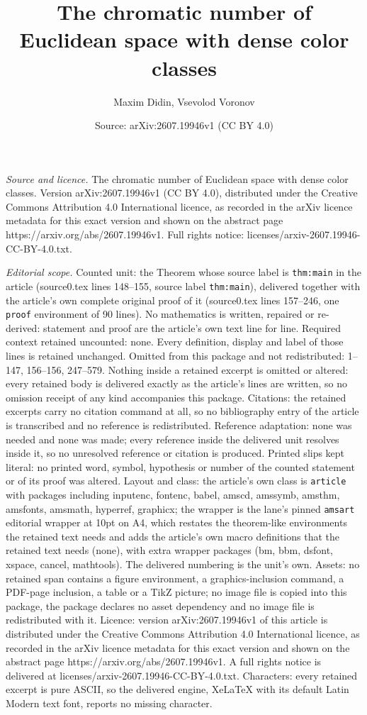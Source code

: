 \documentclass[10pt,a4paper]{amsart}
\title[The chromatic number of Euclidean space with dense color cla]{The chromatic number of Euclidean space with dense color classes}
\author{Maxim Didin, Vsevolod Voronov}
\date{Source: arXiv:2607.19946v1 (CC BY 4.0)}
\begin{document}
\maketitle

\noindent\emph{Source and licence.} The chromatic number of Euclidean space with dense color classes. Version arXiv:2607.19946v1 (CC BY 4.0), distributed under the Creative Commons Attribution 4.0 International licence, as recorded in the arXiv licence metadata for this exact version and shown on the abstract page https://arxiv.org/abs/2607.19946v1. Full rights notice: licenses/arxiv-2607.19946-CC-BY-4.0.txt.\par\smallskip

\noindent\textit{Editorial scope.} Counted unit: the Theorem whose source label is \texttt{thm:main} in the article (source0.tex lines 148--155, source label \texttt{thm:main}), delivered together with the article's own complete original proof of it (source0.tex lines 157--246, one \texttt{proof} environment of 90 lines). No mathematics is written, repaired or re-derived: statement and proof are the article's own text line for line. Required context retained uncounted: none. Every definition, display and label of those lines is retained unchanged. Omitted from this package and not redistributed: 1--147, 156--156, 247--579. Nothing inside a retained excerpt is omitted or altered: every retained body is delivered exactly as the article's lines are written, so no omission receipt of any kind accompanies this package. Citations: the retained excerpts carry no citation command at all, so no bibliography entry of the article is transcribed and no reference is redistributed. Reference adaptation: none was needed and none was made; every reference inside the delivered unit resolves inside it, so no unresolved reference or citation is produced. Printed slips kept literal: no printed word, symbol, hypothesis or number of the counted statement or of its proof was altered. Layout and class: the article's own class is \texttt{article} with packages including inputenc, fontenc, babel, amscd, amssymb, amsthm, amsfonts, amsmath, hyperref, graphicx; the wrapper is the lane's pinned \texttt{amsart} editorial wrapper at 10pt on A4, which restates the theorem-like environments the retained text needs and adds the article's own macro definitions that the retained text needs (none), with extra wrapper packages (bm, bbm, dsfont, xspace, cancel, mathtools). The delivered numbering is the unit's own. Assets: no retained span contains a figure environment, a graphics-inclusion command, a PDF-page inclusion, a table or a TikZ picture; no image file is copied into this package, the package declares no asset dependency and no image file is redistributed with it. Licence: version arXiv:2607.19946v1 of this article is distributed under the Creative Commons Attribution 4.0 International licence, as recorded in the arXiv licence metadata for this exact version and shown on the abstract page https://arxiv.org/abs/2607.19946v1. A full rights notice is delivered at licenses/arxiv-2607.19946-CC-BY-4.0.txt. Characters: every retained excerpt is pure ASCII, so the delivered engine, XeLaTeX with its default Latin Modern text font, reports no missing character.
\end{document}
